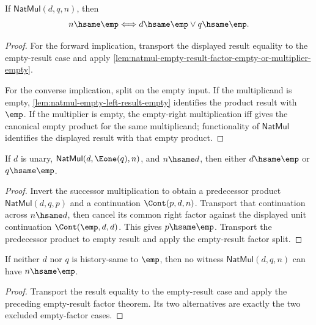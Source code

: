 \begin{theorem}
\label{thm:natmul-empty-result-factor-empty-or-multiplier-empty-iff}
If \(\mathsf{NatMul}(d,q,n)\), then
$$
n\hsame\emp
\Longleftrightarrow
d\hsame\emp \vee q\hsame\emp .
$$
\end{theorem}
\begin{proof}
For the forward implication, transport the displayed result equality to the
empty-result case and apply
\autoref{lem:natmul-empty-result-factor-empty-or-multiplier-empty}.

For the converse implication, split on the empty input. If the multiplicand is
empty, \autoref{lem:natmul-empty-left-result-empty} identifies the product
result with \(\emp\). If the multiplier is empty, the empty-right
multiplication iff gives the canonical empty product for the same multiplicand;
functionality of \(\mathsf{NatMul}\) identifies the displayed result with that
empty product.
\end{proof}

\begin{theorem}
\label{thm:nat-mul-succ-result-eq-factor-empty-or-multiplier-empty}
If \(d\) is unary, \(\mathsf{NatMul}(d,\Eone(q),n)\), and
\(n\hsame d\), then either \(d\hsame\emp\) or \(q\hsame\emp\).
\end{theorem}
\begin{proof}
Invert the successor multiplication to obtain a predecessor product
\(\mathsf{NatMul}(d,q,p)\) and a continuation \(\Cont(p,d,n)\). Transport that
continuation across \(n\hsame d\), then cancel its common right factor against
the displayed unit continuation \(\Cont(\emp,d,d)\). This gives \(p\hsame\emp\).
Transport the predecessor product to empty result and apply the empty-result
factor split.
\end{proof}

\begin{theorem}
\label{thm:natmul-nonempty-factors-result-not-empty}
If neither \(d\) nor \(q\) is history-same to \(\emp\), then no witness
\(\mathsf{NatMul}(d,q,n)\) can have \(n\hsame\emp\).
\end{theorem}
\begin{proof}
Transport the result equality to the empty-result case and apply the preceding
empty-result factor theorem. Its two alternatives are exactly the two excluded
empty-factor cases.
\end{proof}

